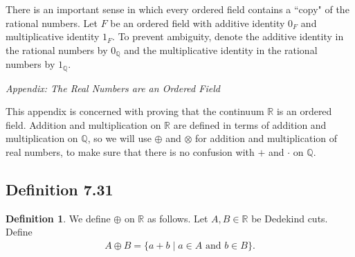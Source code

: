 \documentclass[openany, amssymb, psamsfonts]{amsart}
\newcommand{\bbQ}{\mathbb{Q}}
\newcommand{\bbR}{\mathbb{R}}
\theoremstyle{definition}
\newtheorem{defn}{Definition}[section]
\numberwithin{equation}{section}
\begin{document}
There is an important sense in which every ordered field contains a ``copy" of the rational numbers. Let $F$ be an ordered field with additive identity $0_F$ and multiplicative identity $1_F$. To prevent ambiguity, denote the additive identity in the rational numbers by $0_\bbQ$ and the multiplicative identity in the rational numbers by $1_\bbQ$.\medskip
\begin{center}
{\em Appendix: The Real Numbers are an Ordered Field}
\end{center} 
This appendix is concerned with proving that the continuum $\bbR$ is an ordered field.  Addition and multiplication on $\bbR$ are defined in terms of addition and multiplication on $\bbQ$, so we will use $\oplus$ and $\otimes$ for addition and multiplication of real numbers, to make sure that there is no confusion with $+$ and $\cdot$ on $\bbQ$.


\subsection*{Definition 7.31}
\begin{defn}
\label{7.31}
	We define $\oplus $ on $\bbR$ as follows. Let $A,B\in\bbR$ be Dedekind cuts. Define
	\begin{align*}
		A \oplus B = \{a + b \mid a \in A\text{ and }b \in B\}.
	\end{align*}
\end{defn}
\end{document}
